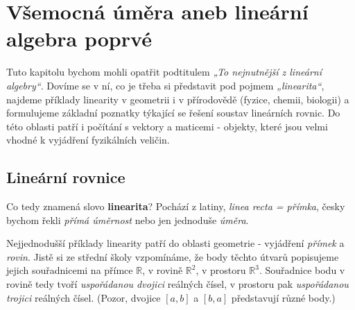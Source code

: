 \chapter{Všemocná úměra aneb lineární algebra poprvé}\label{mai:IchapII}
\minitoc
  Tuto kapitolu bychom mohli opatřit podtitulem \emph{„To nejnutnější z lineární algebry“}. 
  Dovíme se v ní, co je třeba si představit pod pojmem \emph{„linearita“}, najdeme příklady 
  linearity v geometrii i v přírodovědě (fyzice, chemii, biologii) a formulujeme základní 
  poznatky týkající se řešení soustav lineárních rovnic. Do této oblasti patří i počítání s 
  vektory a maticemi - objekty, které jsou velmi vhodné k vyjádření fyzikálních veličin.
    
  \section{Lineární rovnice}\label{mai:IchapIIsecI}
    Co tedy znamená slovo \textbf{linearita}? Pochází z latiny, \emph{linea recta = přímka}, 
    česky bychom řekli \emph{přímá úměrnost} nebo jen jednoduše \emph{úměra}.
    
    Nejjednodušší příklady linearity patří do oblasti geometrie - vyjádření \emph{přímek} a 
    \emph{rovin}. Jistě si ze střední školy vzpomínáme, že body těchto útvarů popisujeme jejich 
    souřadnicemi na přímce \(\mathbb{R}\), v rovině \(\mathbb{R}^2\), v prostoru \(\mathbb{R}^3\). 
    Souřadnice bodu v rovině tedy tvoří \emph{uspořádanou dvojici} reálných čísel, v prostoru pak 
    \emph{uspořádanou trojici} reálných čísel. (Pozor, dvojice \([a, b]\) a \([b, a]\) představují 
    různé body.)

